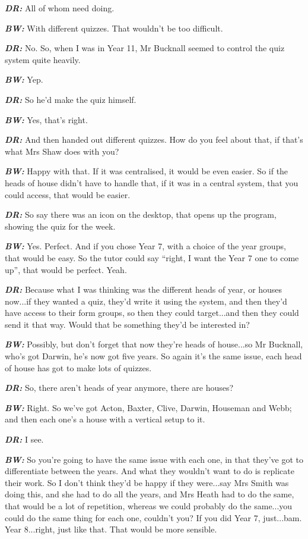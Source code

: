 \textit{\textbf{DR:}} All of whom need doing.

\textit{\textbf{BW:}} With different quizzes. That wouldn't be too difficult.

\textit{\textbf{DR:}} No. So, when I was in Year 11, Mr Bucknall seemed to control the quiz system quite heavily.

\textit{\textbf{BW:}} Yep.

\textit{\textbf{DR:}} So he'd make the quiz himself.

\textit{\textbf{BW:}} Yes, that's right.

\textit{\textbf{DR:}} And then handed out different quizzes. How do you feel about that, if that's what Mrs Shaw does with you?

\textit{\textbf{BW:}} Happy with that. If it was centralised, it would be even easier. So if the heads of house didn't have to handle that, if it was in a central system, that you could access, that would be easier.

\textit{\textbf{DR:}} So say there was an icon on the desktop, that opens up the program, showing the quiz for the week. 

\textit{\textbf{BW:}} Yes. Perfect. And if you chose Year 7, with a choice of the year groups, that would be easy. So the tutor could say ``right, I want the Year 7 one to come up'', that would be perfect. Yeah.

\textit{\textbf{DR:}} Because what I was thinking was the different heads of year, or houses now...if they wanted a quiz, they'd write it using the system, and then they'd have access to their form groups, so then they could target...and then they could send it that way. Would that be something they'd be interested in?

\textit{\textbf{BW:}} Possibly, but don't forget that now they're heads of house...so Mr Bucknall, who's got Darwin, he's now got five years. So again it's the same issue, each head of house has got to make lots of quizzes. 

\textit{\textbf{DR:}} So, there aren't heads of year anymore, there are houses?

\textit{\textbf{BW:}} Right. So we've got Acton, Baxter, Clive, Darwin, Houseman and Webb; and then each one's a house with a vertical setup to it.

\textit{\textbf{DR:}} I see.

\textit{\textbf{BW:}} So you're going to have the same issue with each one, in that they've got to differentiate between the years. And what they wouldn't want to do is replicate their work. So I don't think they'd be happy if they were...say Mrs Smith was doing this, and she had to do all the years, and Mrs Heath had to do the same, that would be a lot of repetition, whereas we could probably do the same...you could do the same thing for each one, couldn't you? If you did Year 7, just...bam. Year 8...right, just like that. That would be more sensible.

